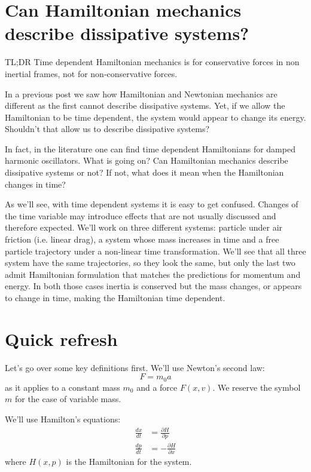 \documentclass[aps,pra,10pt,floatfix,nofootinbib]{revtex4-1}
\theoremstyle{definition}
\begin{document}
	
\section{Can Hamiltonian mechanics describe dissipative systems?}

TL;DR Time dependent Hamiltonian mechanics is for conservative forces in non inertial frames, not for non-conservative forces.

In a previous post we saw how Hamiltonian and Newtonian mechanics are different as the first cannot describe dissipative systems. Yet, if we allow the Hamiltonian to be time dependent, the system would appear to change its energy. Shouldn't that allow us to describe dissipative systems?

In fact, in the literature one can find time dependent Hamiltonians for damped harmonic oscillators. What is going on? Can Hamiltonian mechanics describe dissipative systems or not? If not, what does it mean when the Hamiltonian changes in time?

As we'll see, with time dependent systems it is easy to get confused. Changes of the time variable may introduce effects that are not usually discussed and therefore expected. We'll work on three different systems: particle under air friction (i.e. linear drag), a system whose mass increases in time and a free particle trajectory under a non-linear time transformation. We'll see that all three system have the same trajectories, so they look the same, but only the last two admit Hamiltonian formulation that matches the predictions for momentum and energy. In both those cases inertia is conserved but the mass changes, or appears to change in time, making the Hamiltonian time dependent.

\section{Quick refresh}

Let's go over some key definitions first. We'll use Newton's second law:
\begin{equation}
\label{Fm_0a}
F=m_0a
\end{equation}
as it applies to a constant mass $m_0$ and a force $F(x,v)$. We reserve the symbol $m$ for the case of variable mass.

We'll use Hamilton's equations:
\begin{equation}
\begin{aligned}
\frac{dx}{dt} &= \frac{\partial H}{\partial p} \\
\frac{dp}{dt} &= - \frac{\partial H}{\partial x}
\end{aligned}
\label{Hamilton}
\end{equation}
where $H(x,p)$ is the Hamiltonian for the system.
\end{document}
